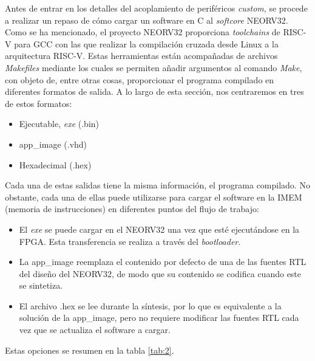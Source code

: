 Antes de entrar en los detalles del acoplamiento de periféricos \textit{custom}, se procede a realizar un repaso de cómo cargar un software en C al \textit{softcore} NEORV32.
Como se ha mencionado, el proyecto NEORV32 proporciona \textit{toolchains} de RISC-V para GCC con las que realizar la compilación cruzada desde Linux a la arquitectura RISC-V.
Estas herramientas están acompañadas de archivos \textit{Makefiles} mediante los cuales se permiten añadir argumentos al comando \textit{Make}, con objeto de, entre otras cosas, proporcionar el programa compilado en diferentes formatos de salida.
A lo largo de esta sección, nos centraremos en tres de estos formatos:

\begin{itemize}
    \item Ejecutable, \textit{exe} (.bin)
    \item app\_image (.vhd)
    \item Hexadecimal (.hex)
\end{itemize} 

Cada una de estas salidas tiene la misma información, el programa compilado.
No obstante, cada una de ellas puede utilizarse para cargar el software en la IMEM (memoria de instrucciones) en diferentes puntos del flujo de trabajo:

\begin{itemize}
    \item El \textit{exe} se puede cargar en el NEORV32 una vez que esté ejecutándose en la FPGA. Esta transferencia se realiza a través del \textit{bootloader}.
    \item La app\_image reemplaza el contenido por defecto de una de las fuentes RTL del diseño del NEORV32, de modo que su contenido se codifica cuando este se sintetiza.
    \item El archivo .hex se lee durante la síntesis, por lo que es equivalente a la solución de la app\_image, pero no requiere modificar las fuentes RTL cada vez que se actualiza el software a cargar.
\end{itemize} 

Estas opciones se resumen en la tabla \ref{tab:2}.

